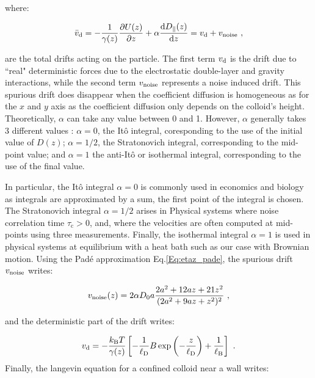 where:

\begin{equation}
	\bar{v}_\textnormal{d} = - \frac{1}{\gamma(z)}\frac{\partial U(z)}{\partial z} +  \alpha  \frac{\textnormal{d} D_\parallel(z)}{\textnormal{d}z}  = v_\textnormal{d} + v_\textnormal{noise}~,
	\label{Eq.total_drifts}
\end{equation}

are the total drifts acting on the particle. The first term $v_\textnormal{d}$ is the drift  due to ``real" deterministic forces due to the electrostatic double-layer and gravity interactions, while the second term $ v_\textnormal{noise}$ represents a noise induced drift. This spurious drift does disappear when the coefficient diffusion is homogeneous as for the $x$ and $y$ axis as the coefficient diffusion only depends on the colloid's height. Theoretically, $\alpha$ can take any value between 0 and 1. However, $\alpha$ generally takes 3 different values \cite{volpe_effective_2016}:  $\alpha = 0$, the Itô integral, coresponding to the use of the initial value of $D(z)$; $\alpha = 1/2$, the Stratonovich integral, corresponding to the mid-point value; and $\alpha = 1$ the anti-Itô or isothermal integral, corresponding to the use of the final value. 

In particular, the Itô integral $\alpha = 0$ is commonly used in economics and biology as integrals are approximated by a sum, the first point of the integral is chosen.  The Stratonovich integral $\alpha = 1/2$ arises in Physical systems where noise correlation time $\tau _\mathrm{c} > 0$, and, where the velocities are often computed at mid-points using three measurements. Finally, the isothermal integral $\alpha = 1$ is used in physical systems at equilibrium with a heat bath \cite{volpe_influence_2010} such as our case with Brownian motion. Using the Padé approximation Eq.\ref{Eq:etaz_pade}, the spurious drift $v_\textnormal{noise}$ writes:

\begin{equation}
	v_\textnormal{noise} (z)= 2 \alpha D_0 a\frac{2a^2 + 12 az + 21 z^2}{(2 a^2 + 9az + z^2) ^2} ~,
	\label{Eq.spurious_drift}
\end{equation}

and the deterministic part of the drift writes:

\begin{equation}
	v_\textnormal{d} =- \frac{k_\mathrm{B}T}{\gamma(z)} \left[- \frac{1}{\ell_\mathrm{D}} B \exp \left(- \frac{z}{\ell_\mathrm{D}}\right) + \frac{1}{\ell_\mathrm{B}}\right] ~.
\end{equation}
Finally, the langevin equation for a confined colloid near a wall writes:

